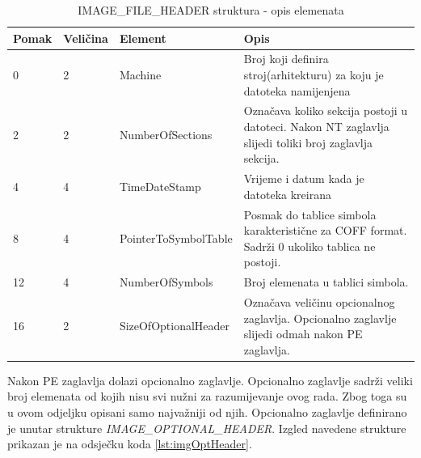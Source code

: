 \documentclass[times, utf8, diplomski, numeric]{fer}
\begin{document}
\begin{table}[htb]
\small
\caption{IMAGE\_FILE\_HEADER struktura - opis elemenata}
\label{tbl:imgFileHdr}
\centering
\begin{tabular}{|l|l|l|p{6cm}|}
\hline
Pomak & Veličina & Element & Opis \\ \hline
0 & 2 & Machine & Broj koji definira stroj(arhitekturu) za koju je datoteka namijenjena \\ \hline
2 & 2 & NumberOfSections & Označava koliko sekcija postoji u datoteci. Nakon NT zaglavlja slijedi toliki broj zaglavlja sekcija. \\ \hline
4 & 4 & TimeDateStamp & Vrijeme i datum kada je datoteka kreirana \\ \hline
8 & 4 & PointerToSymbolTable & Posmak do tablice simbola karakteristične za COFF format. Sadrži 0 ukoliko tablica ne postoji. \\ \hline
12 & 4 & NumberOfSymbols & Broj elemenata u tablici simbola. \\ \hline
16 & 2 & SizeOfOptionalHeader & Označava veličinu opcionalnog zaglavlja. Opcionalno zaglavlje slijedi odmah nakon PE zaglavlja. \\ \hline
\end{tabular}
\end{table}
Nakon PE zaglavlja dolazi opcionalno zaglavlje. Opcionalno zaglavlje sadrži veliki broj elemenata od kojih nisu svi nužni za razumijevanje ovog rada. Zbog toga su u ovom odjeljku opisani samo najvažniji od njih. Opcionalno zaglavlje definirano je unutar strukture \emph{IMAGE\_OPTIONAL\_HEADER}. Izgled navedene strukture prikazan je na odsječku koda \ref{lst:imgOptHeader}.
\end{document}
